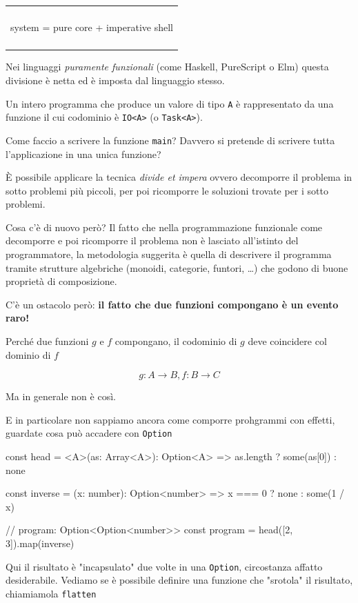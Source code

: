 \documentclass[12pt]{article}
\theoremstyle{definition}
\newenvironment{demo}
    {\begin{center}
    \begin{tabular}{|p{0.9\textwidth}|}
    \hline\\
    }
    {
    \\\\\hline
    \end{tabular}
    \end{center}
    }
\newenvironment{code}
  {\vspace{0.5cm} \VerbatimEnvironment\begin{typescriptcode}}
  {\end{typescriptcode} \vspace{0.2cm}}
\begin{document}
\begin{demo}
\begin{center}
system = pure core + imperative shell
\end{center}
\end{demo}

Nei linguaggi \emph{puramente funzionali} (come Haskell, PureScript o Elm) questa divisione è netta ed è imposta dal linguaggio stesso.

Un intero programma che produce un valore di tipo \texttt{A} è rappresentato da una funzione il cui codominio è \texttt{IO<A>} (o \texttt{Task<A>}).

Come faccio a scrivere la funzione \texttt{main}? Davvero si pretende di scrivere tutta l'applicazione in una unica funzione?

È possibile applicare la tecnica \emph{divide et impera} ovvero decomporre il problema in sotto problemi più piccoli,
per poi ricomporre le soluzioni trovate per i sotto problemi.

Cosa c'è di nuovo però? Il fatto che nella programmazione funzionale come decomporre e poi ricomporre il problema non è lasciato
all'istinto del programmatore, la metodologia suggerita è quella di descrivere il programma tramite strutture algebriche
(monoidi, categorie, funtori, \ldots) che godono di buone proprietà di composizione.

C'è un ostacolo però: \textbf{il fatto che due funzioni compongano è un evento raro!}

Perché due funzioni $g$ e $f$ compongano, il codominio di $g$ deve coincidere col dominio di $f$

$$
g: A \rightarrow B, f: B \rightarrow C
$$

Ma in generale non è così.

E in particolare non sappiamo ancora come comporre prohgrammi con effetti, guardate cosa può accadere con \texttt{Option}

\begin{code}
const head = <A>(as: Array<A>): Option<A> =>
  as.length ? some(as[0]) : none

const inverse = (x: number): Option<number> =>
  x === 0 ? none : some(1 / x)

// program: Option<Option<number>>
const program = head([2, 3]).map(inverse)
\end{code}

Qui il risultato è "incapsulato" due volte in una \texttt{Option}, circostanza affatto desiderabile.
Vediamo se è possibile definire una funzione che "srotola" il risultato, chiamiamola \texttt{flatten}
\end{document}
